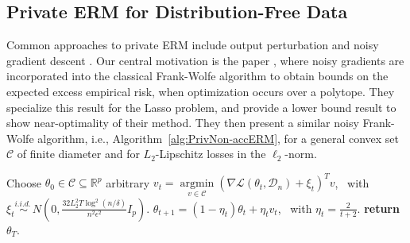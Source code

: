 \documentclass{article}
\newcommand{\iid}{i.i.d.{\ }}
\begin{document}

\subsection{Private ERM for Distribution-Free Data}
\label{sec:{Private ERM for Distribution-Free Data: Upper and Lower Bounds}}

Common approaches to private ERM include output perturbation \cite{EFF_PRIV_SCO, (NEAR), BOLT_ON_PRIV, EFF_PRIV_SMOOTH} and noisy gradient descent \cite{NO_ROB_LR, NOPL}. Our central motivation is the paper \cite{NOPL}, where noisy gradients are incorporated into the classical Frank-Wolfe algorithm to obtain bounds on the expected excess empirical risk, when optimization occurs over a polytope. They specialize this result for the Lasso problem, and provide a lower bound result to show near-optimality of their method. They then present a similar noisy Frank-Wolfe algorithm, i.e., Algorithm~\ref{alg:PrivNon-accERM}, for a general convex set $\mathcal{C}$ of finite diameter and for $L_2$-Lipschitz losses in the $\ell_2$-norm.

\begin{algorithm}
\caption{$\mathcal{A}_{\text{Noise-FW(Gen-convex)}}$: Differentially Private Frank-Wolfe Algorithm (General Convex
Case)}
\label{alg:PrivNon-accERM}
\begin{algorithmic}[1]
\State Choose $\theta_0 \in \mathcal{C} \subseteq \mathbb{R}^p$ arbitrary
    \State $v_t = \mathop{\arg \min}\limits_{v \in \mathcal{C}} (\nabla \mathcal{L}(\theta_t, \mathcal{D}_n) + \xi_t)^Tv$, \ with \ $\xi_t \overset{\iid}{\sim} N\left(0, \frac{32L_2^2T\log^2(n/\delta)}{n^2\epsilon^2}I_p\right)$.
        \State $\theta_{t + 1} = (1 - \eta_t)\theta_t + \eta_t v_t$, \ with $\eta_t = \frac{2}{t + 2}$.
    \EndFor
    \State \textbf{return} $\theta_T$.
\EndFunction
\end{algorithmic}
\end{algorithm}
\end{document}
